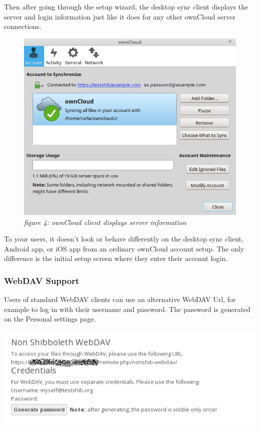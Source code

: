 \documentclass[letterpaper,10pt,english]{sphinxmanual}
\begin{document}
Then after going through the setup wizard, the desktop sync client displays the
server and login information just like it does for any other ownCloud server
connections.
\begin{figure}[htbp]
\centering
\capstart

\includegraphics{shib-gui4.png}
\caption{\emph{figure 4: ownCloud client displays server information}}\end{figure}

To your users, it doesn't look or behave differently on the desktop sync
client, Android app, or iOS app from an ordinary ownCloud account setup. The
only difference is the initial setup screen where they enter their account
login.


\subsubsection{WebDAV Support}
\label{enterprise_user_management/user_auth_shibboleth:webdav-support}
Users of standard WebDAV clients can use an alternative
WebDAV Url, for example 
to log in with their username and password. The password is generated on the
Personal settings page.

\includegraphics{shibboleth-personal.png}
\end{document}
